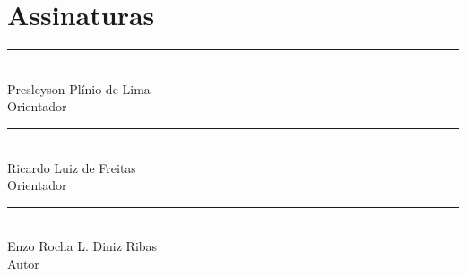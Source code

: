 
\chapter*{Assinaturas}

\vspace{3cm}

\noindent\begin{minipage}{\textwidth}
\centering

\vspace{3cm}

\rule{8cm}{0.4pt}\\
Presleyson Plínio de Lima\\
Orientador\\

\vspace{3cm}

\rule{8cm}{0.4pt}\\
Ricardo Luiz de Freitas\\
Orientador\\

\vspace{3cm}

\rule{8cm}{0.4pt}\\
Enzo Rocha L. Diniz Ribas\\
Autor\\

\end{minipage}